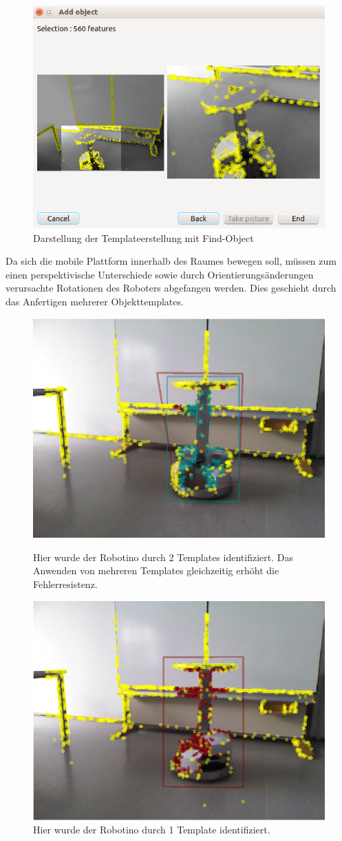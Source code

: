 	\begin{figure}[H]
	\centering
	\includegraphics[width=0.7\linewidth]{../media/add-object-2}
	\caption[template-addobject]{Darstellung der Templateerstellung mit Find-Object}
	\label{fig:add-object-2}
	\end{figure}

	Da sich die mobile Plattform innerhalb des Raumes bewegen soll, müssen zum einen perspektivische Unterschiede sowie durch Orientierungsänderungen verursachte Rotationen des Roboters abgefangen werden. Dies geschieht durch das Anfertigen mehrerer Objekttemplates.\newline
	
		\begin{figure}
		\centering
		\includegraphics[width=0.7\linewidth]{../media/fo-robo-3}
		\caption{Hier wurde der Robotino durch 2 Templates identifiziert. Das Anwenden von mehreren Templates gleichzeitig erhöht die Fehlerresistenz.}
		\includegraphics[width=0.7\linewidth]{../media/fo-robotino-1}
		\caption{Hier wurde der Robotino durch 1 Template identifiziert.}
		\label{fig:fo-robo-3}
		\end{figure}

